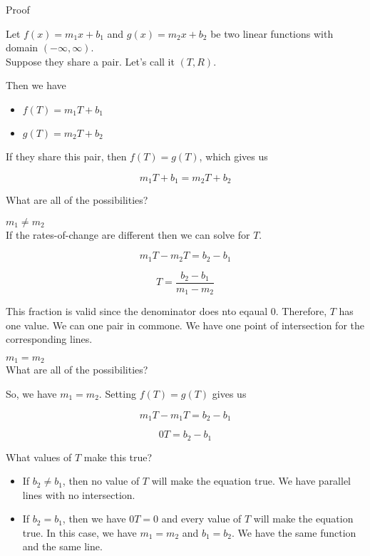 \documentclass{ximera}
\begin{document}
\begin{explanation} Proof 


Let $f(x) = m_1 x + b_1$ and $g(x) = m_2 x + b_2$ be two linear functions with domain $(-\infty, \infty)$. \\
Suppose they share a pair. Let's call it $(T, R)$.

Then we have 

\begin{itemize}
\item $f(T) = m_1 T + b_1$
\item $g(T) = m_2 T + b_2$
\end{itemize}

If they share this pair, then $f(T) = g(T)$, which gives us

\[     m_1 T + b_1 =  m_2 T + b_2  \]


What are all of the possibilities?


  $m_1 \ne m_2$ \\

If the rates-of-change are different then we can solve for $T$.

\[     m_1 T - m_2 T =  b_2 -b_1 \]


\[     T =  \frac{b_2 -b_1}{m_1 - m_2}  \]

This fraction is valid since the denominator does nto eqaual $0$.  Therefore, $T$ has one value.  We can one pair in commone.  We have one point of intersection for the corresponding lines.



  $m_1 = m_2$ \\

What are all of the possibilities?

So, we have $m_1 = m_2$.  Setting $f(T) = g(T)$ gives us 



\[     m_1 T - m_1 T =  b_2 - b_1 \]


\[     0 T =  b_2 - b_1 \]


What values of $T$ make this true?


\begin{itemize}
\item If $b_2 \ne b_1$, then no value of $T$ will make the equation true.  We have parallel lines with no intersection.

\item If $b_2 = b_1$, then we have $0 T =  0$ and every value of $T$ will make the equation true.  In this case, we have $m_1 = m_2$ and $b_1 = b_2$.  We have the same function and the same line.
\end{itemize}




\end{explanation}
\end{document}
